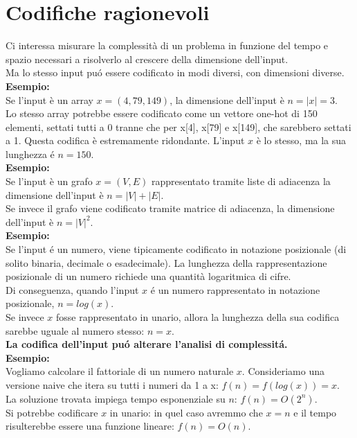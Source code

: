 \section{Codifiche ragionevoli}

Ci interessa misurare la complessità di un problema in funzione del tempo e spazio necessari a risolverlo al crescere della dimensione dell'input. \\
Ma lo stesso input puó essere codificato in modi diversi, con dimensioni diverse. \\

\textbf{Esempio:} \\
Se l'input è un array $x = (4, 79, 149)$, la dimensione dell'input è $n = |x| = 3$. \\
Lo stesso array potrebbe essere codificato come un vettore one-hot di 150 elementi, settati tutti a 0 tranne che per x[4], x[79] e x[149], che sarebbero settati a 1. Questa codifica è estremamente ridondante. L'input $x$ è lo stesso, ma la sua lunghezza é $n = 150$. \\

\textbf{Esempio:} \\
Se l'input è un grafo $x = (V, E)$ rappresentato tramite liste di adiacenza la dimensione dell'input è $n = |V| + |E|$. \\
Se invece il grafo viene codificato tramite matrice di adiacenza, la dimensione dell'input è $n = |V|^2$. \\

\textbf{Esempio:} \\
Se l'input é un numero, viene tipicamente codificato in notazione posizionale (di solito binaria, decimale o esadecimale).
La lunghezza della rappresentazione posizionale di un numero richiede una quantità logaritmica di cifre. \\
Di conseguenza, quando l'input $x$ é un numero rappresentato in notazione posizionale, $n = log(x)$. \\
Se invece $x$ fosse rappresentato in unario, allora la lunghezza della sua codifica sarebbe uguale al numero stesso: $n = x$. \\

\textbf{La codifica dell'input puó alterare l'analisi di complessitá.} \\

\textbf{Esempio:} \\
Vogliamo calcolare il fattoriale di un numero naturale $x$. Consideriamo una versione naive che itera su tutti i numeri da 1 a x: $f(n) = f(log(x)) = x$. \\
La soluzione trovata impiega tempo esponenziale su $n$: $f(n) = O(2^n)$. \\
Si potrebbe codificare $x$ in unario: in quel caso avremmo che $x = n$ e il tempo risulterebbe essere una funzione lineare: $f(n) = O(n)$. \\

